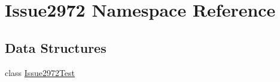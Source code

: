 \hypertarget{namespace_issue2972}{}\section{Issue2972 Namespace Reference}
\label{namespace_issue2972}
\subsection*{Data Structures}
\begin{DoxyCompactItemize}
\item 
class \mbox{\hyperlink{class_issue2972_1_1_issue2972_test}{Issue2972\+Test}}
\end{DoxyCompactItemize}
